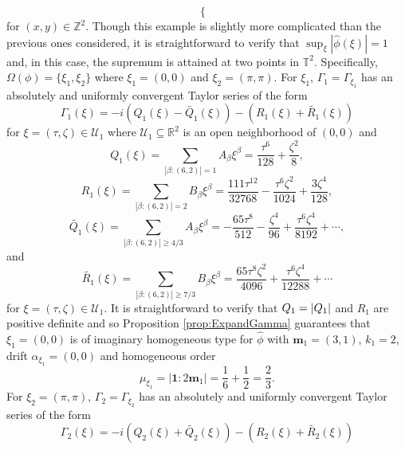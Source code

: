 \documentclass[11pt]{article}
\newenvironment{example}
  {\pushQED{\qed}\renewcommand{\qedsymbol}{$\triangle$}\examplex}
  {\popQED\endexamplex}
\theoremstyle{remark}
\newcommand{\f}[2]{\frac{#1}{#2}}
\begin{document}
\begin{example}
\begin{equation*}
\begin{cases}
    \end{cases}
\end{equation*}
for $(x,y)\in\mathbb{Z}^2$. Though this example is slightly more complicated than the previous ones considered, it is straightforward to verify that $\sup_{\xi}|\widehat{\phi}(\xi)|=1$ and, in this case, the supremum is attained at two points in $\mathbb{T}^2$. Specifically, $\Omega(\phi)=\{\xi_1,\xi_2\}$ where $\xi_1=(0,0)$ and $\xi_2=(\pi,\pi)$. For $\xi_1$, $\Gamma_1=\Gamma_{\xi_1}$ has an absolutely and uniformly convergent Taylor series of the form
\begin{equation*}
    \Gamma_{1}(\xi)=-i\left(Q_{1}(\xi)-\widetilde{Q_1}(\xi)\right)-\left(R_1(\xi)+\widetilde{R_1}(\xi)\right)
\end{equation*}
for $\xi=(\tau,\zeta)\in\mathcal{U}_1$ where $\mathcal{U}_1\subseteq\mathbb{R}^2$ is an open neighborhood of $(0,0)$ and
\begin{equation*}
    Q_{1}(\xi)=\sum_{|\beta:(6,2)|=1}A_\beta \xi^\beta=\frac{\tau^6}{128}+\frac{\zeta^2}{8},
\end{equation*}
\begin{equation*}
    R_1(\xi)=\sum_{|\beta:(6,2)|=2}B_\beta\xi^\beta=\frac{111\tau^{12}}{32768}-\frac{\tau^6 \zeta^2}{1024}+\frac{3\zeta^4}{128},
\end{equation*}
\begin{equation*}
    \widetilde{Q_1}(\xi)=\sum_{|\beta:(6,2)|\geq 4/3}A_\beta \xi^\beta=-\f{65\tau^8}{512} -\f{\zeta^4}{96} + \frac{\tau^6\zeta^4}{8192} 
    +\cdots,
\end{equation*}
and
\begin{equation*}
    \widetilde{R_1}(\xi)=\sum_{|\beta:(6,2)|\geq 7/3}B_\beta\xi^\beta=\f{65\tau^8\zeta^2}{4096}  + \f{\tau^6 \zeta^4}{12288} + \cdots
\end{equation*}
for $\xi=(\tau,\zeta)\in\mathcal{U}_1$. It is straightforward to verify that $Q_1=\abs{Q_1}$ and $R_1$ are positive definite and so Proposition \ref{prop:ExpandGamma} guarantees that $\xi_1=(0,0)$ is of imaginary homogeneous type for $\widehat{\phi}$ with $\mathbf{m}_1=(3,1)$, $k_1=2$, drift $\alpha_{\xi_1}=(0,0)$ and homogeneous order
\begin{equation*}
    \mu_{\xi_1}=|\mathbf{1}:2\mathbf{m}_1|=\frac{1}{6}+\frac{1}{2}=\frac{2}{3}.
\end{equation*}
For $\xi_2 = (\pi,\pi)$, $\Gamma_2=\Gamma_{\xi_2}$ has an absolutely and uniformly convergent Taylor series of the form
\begin{equation*}
    \Gamma_2(\xi)=-i\left(Q_2(\xi)+\widetilde{Q_2}(\xi)\right)-\left(R_2(\xi)+\widetilde{R_2}(\xi)\right)

\end{equation*}
\end{example}
\end{document}
